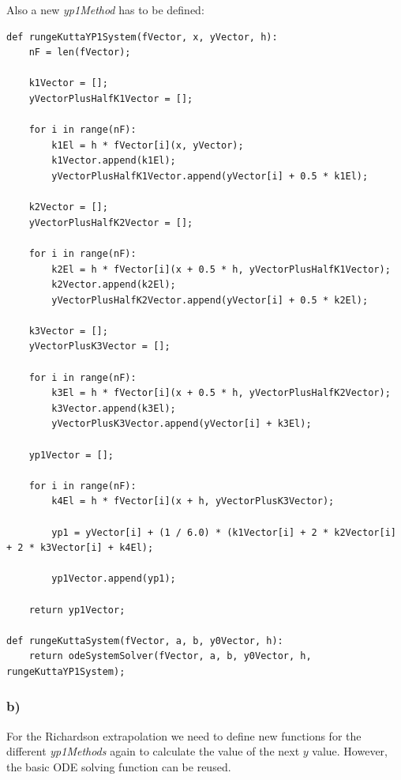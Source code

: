 Also a new \textit{yp1Method} has to be defined:

\begin{lstlisting}[caption=todo]
def rungeKuttaYP1System(fVector, x, yVector, h):
	nF = len(fVector);
	
	k1Vector = [];
	yVectorPlusHalfK1Vector = [];
	
	for i in range(nF):
		k1El = h * fVector[i](x, yVector);
		k1Vector.append(k1El);
		yVectorPlusHalfK1Vector.append(yVector[i] + 0.5 * k1El);
	
	k2Vector = [];
	yVectorPlusHalfK2Vector = [];
	
	for i in range(nF):
		k2El = h * fVector[i](x + 0.5 * h, yVectorPlusHalfK1Vector);
		k2Vector.append(k2El);
		yVectorPlusHalfK2Vector.append(yVector[i] + 0.5 * k2El);
	
	k3Vector = [];
	yVectorPlusK3Vector = [];
	
	for i in range(nF):
		k3El = h * fVector[i](x + 0.5 * h, yVectorPlusHalfK2Vector);
		k3Vector.append(k3El);
		yVectorPlusK3Vector.append(yVector[i] + k3El);
	
	yp1Vector = [];
	
	for i in range(nF):
		k4El = h * fVector[i](x + h, yVectorPlusK3Vector);
		
		yp1 = yVector[i] + (1 / 6.0) * (k1Vector[i] + 2 * k2Vector[i] + 2 * k3Vector[i] + k4El);
		
		yp1Vector.append(yp1);
	
	return yp1Vector;

def rungeKuttaSystem(fVector, a, b, y0Vector, h):
	return odeSystemSolver(fVector, a, b, y0Vector, h, rungeKuttaYP1System);
\end{lstlisting}


\subsubsection{b)}

For the Richardson extrapolation we need to define new functions for the different \textit{yp1Methods} again to calculate the value of the next $y$ value. However, the basic ODE solving function can be reused.

